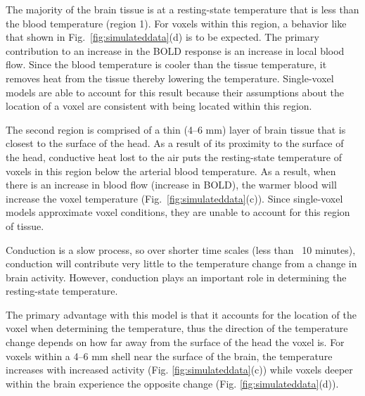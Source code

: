     The majority of the brain tissue is at a resting-state temperature that is less than the blood temperature (region 1).  For voxels within this region, a behavior like that shown in Fig.~\ref{fig:simulateddata}(d) is to be expected.  The primary contribution to an increase in the BOLD response is an increase in local blood flow.  Since the blood temperature is cooler than the tissue temperature, it removes heat from the tissue thereby lowering the temperature.  Single-voxel models are able to account for this result because their assumptions about the location of a voxel are consistent with being located within this region.
    
    The second region is comprised of a thin (4--6 mm) layer of brain tissue that is closest to the surface of the head.  As a result of its proximity to the surface of the head, conductive heat lost to the air puts the resting-state temperature of voxels in this region below the arterial blood temperature.  As a result, when there is an increase in blood flow (increase in BOLD), the warmer blood will increase the voxel temperature (Fig.~\ref{fig:simulateddata}(c)).  Since single-voxel models approximate voxel conditions, they are unable to account for this region of tissue.
    
    Conduction is a slow process, so over shorter time scales (less than ~10 minutes), conduction will contribute very little to the temperature change from a change in brain activity.  However, conduction plays an important role in determining the resting-state temperature.  
    
    The primary advantage with this model is that it accounts for the location of the voxel when determining the temperature, thus the direction of the temperature change depends on how far away from the surface of the head the voxel is. For voxels within a 4--6 mm shell near the surface of the brain, the temperature increases with increased activity (Fig. \ref{fig:simulateddata}(c)) while voxels deeper within the brain experience the opposite change (Fig. \ref{fig:simulateddata}(d)).
    
